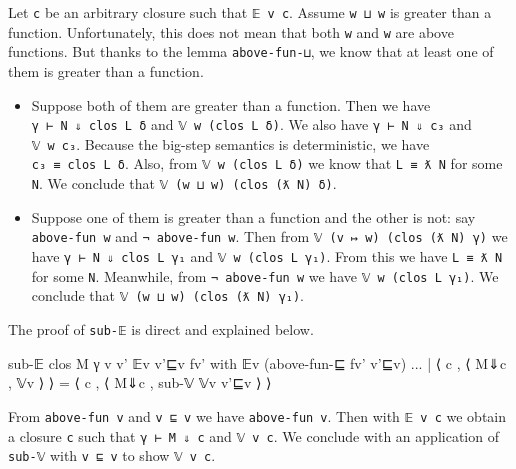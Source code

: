 \begin{itemize}
  Let \texttt{c} be an arbitrary closure such that \texttt{𝔼\ v\ c}.
  Assume \texttt{w\ ⊔\ w\textquotesingle{}} is greater than a function.
  Unfortunately, this does not mean that both \texttt{w} and
  \texttt{w\textquotesingle{}} are above functions. But thanks to the
  lemma \texttt{above-fun-⊔}, we know that at least one of them is
  greater than a function.

  \begin{itemize}
  \item
    Suppose both of them are greater than a function. Then we have
    \texttt{γ\ ⊢\ N\ ⇓\ clos\ L\ δ} and \texttt{𝕍\ w\ (clos\ L\ δ)}. We
    also have \texttt{γ\ ⊢\ N\ ⇓\ c₃} and
    \texttt{𝕍\ w\textquotesingle{}\ c₃}. Because the big-step semantics
    is deterministic, we have \texttt{c₃\ ≡\ clos\ L\ δ}. Also, from
    \texttt{𝕍\ w\ (clos\ L\ δ)} we know that
    \texttt{L\ ≡\ ƛ\ N\textquotesingle{}} for some
    \texttt{N\textquotesingle{}}. We conclude that
    \texttt{𝕍\ (w\ ⊔\ w\textquotesingle{})\ (clos\ (ƛ\ N\textquotesingle{})\ δ)}.
  \item
    Suppose one of them is greater than a function and the other is not:
    say \texttt{above-fun\ w} and
    \texttt{¬\ above-fun\ w\textquotesingle{}}. Then from
    \texttt{𝕍\ (v\ ↦\ w)\ (clos\ (ƛ\ N)\ γ)} we have
    \texttt{γ\ ⊢\ N\ ⇓\ clos\ L\ γ₁} and \texttt{𝕍\ w\ (clos\ L\ γ₁)}.
    From this we have \texttt{L\ ≡\ ƛ\ N\textquotesingle{}} for some
    \texttt{N\textquotesingle{}}. Meanwhile, from
    \texttt{¬\ above-fun\ w\textquotesingle{}} we have
    \texttt{𝕍\ w\textquotesingle{}\ (clos\ L\ γ₁)}. We conclude that
    \texttt{𝕍\ (w\ ⊔\ w\textquotesingle{})\ (clos\ (ƛ\ N\textquotesingle{})\ γ₁)}.
  \end{itemize}
\end{itemize}

The proof of \texttt{sub-𝔼} is direct and explained below.

\begin{fence}
\begin{code}
sub-𝔼 {clos M γ} {v} {v'} 𝔼v v'⊑v fv'
    with 𝔼v (above-fun-⊑ fv' v'⊑v)
... | ⟨ c , ⟨ M⇓c , 𝕍v ⟩ ⟩ =
      ⟨ c , ⟨ M⇓c , sub-𝕍 𝕍v v'⊑v ⟩ ⟩
\end{code}
\end{fence}

From \texttt{above-fun\ v\textquotesingle{}} and
\texttt{v\textquotesingle{}\ ⊑\ v} we have \texttt{above-fun\ v}. Then
with \texttt{𝔼\ v\ c} we obtain a closure \texttt{c} such that
\texttt{γ\ ⊢\ M\ ⇓\ c} and \texttt{𝕍\ v\ c}. We conclude with an
application of \texttt{sub-𝕍} with \texttt{v\textquotesingle{}\ ⊑\ v} to
show \texttt{𝕍\ v\textquotesingle{}\ c}.

